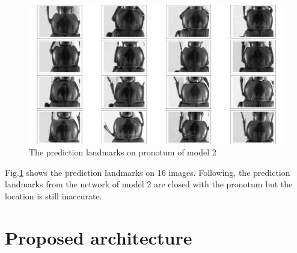 \begin{figure}[h!]
	\centering
	\includegraphics[scale=0.25]{images/figure_1_celia}
	\caption{The prediction landmarks on pronotum of model 2}
	\label{model2pt}
\end{figure}
Fig.\ref{model2pt} shows the prediction landmarks on 16 images. Following, the prediction landmarks from the network of model 2 are closed with the pronotum but the location is still inaccurate.

\section{Proposed architecture}
